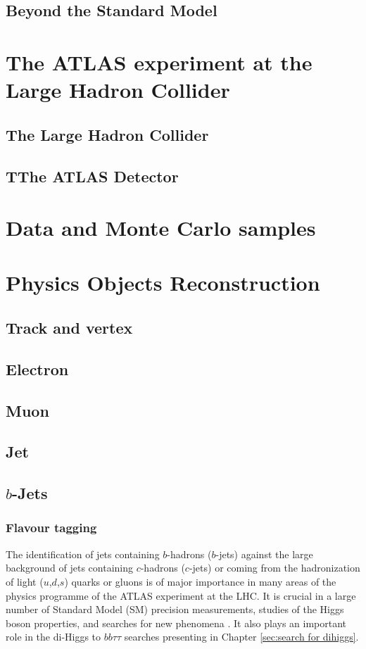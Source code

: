 \documentclass[letterpaper,12pt]{article}
\begin{document}
\subsection{Beyond the Standard Model}
\section{The ATLAS experiment at the Large Hadron Collider}
\subsection{The Large Hadron Collider}
\subsection{TThe ATLAS Detector}
\section{Data and Monte Carlo samples}
\section{Physics Objects Reconstruction}
\subsection{Track and vertex}
\subsection{Electron}
\subsection{Muon}
\subsection{Jet}
\subsection{$b$-Jets}


\subsubsection{Flavour tagging}


The identification of jets containing $b$-hadrons ($b$-jets) 
against the large background of jets containing $c$-hadrons 
($c$-jets) or coming from the hadronization of light ($u$,$d$,$s$) 
quarks or gluons is of major importance in many areas of the 
physics programme of the ATLAS experiment at the LHC. 
It is crucial in a large number of Standard Model (SM) 
precision measurements, studies of the Higgs boson properties, and 
searches for new phenomena \cite{SUSY-2014-08, ATLAS-CONF-2018-043,Interpreting_Higgs_result}.
It also plays an important role in 
the di-Higgs to $bb\tau\tau$ searches presenting in Chapter \ref{sec:search for dihiggs}. 
\end{document}
